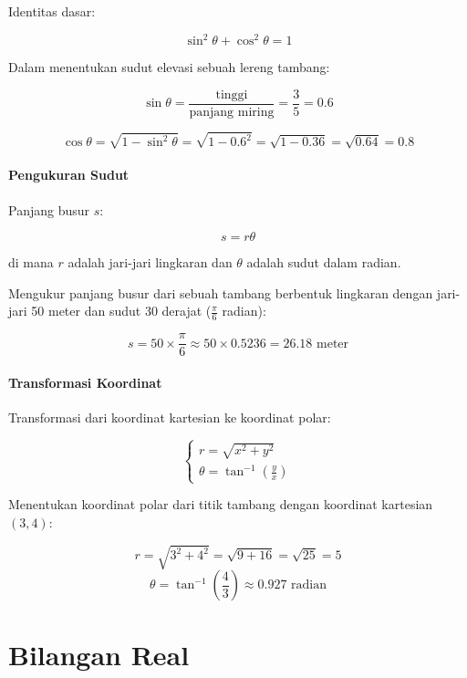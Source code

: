 \documentclass[
]{book}
\begin{document}
Identitas dasar:

\[
\sin^2 \theta + \cos^2 \theta = 1
\]

Dalam menentukan sudut elevasi sebuah lereng tambang:

\[
  \sin \theta = \frac{\text{tinggi}}{\text{panjang miring}} = \frac{3}{5} = 0.6
\]

\[
\cos \theta = \sqrt{1 - \sin^2 \theta} = \sqrt{1 - 0.6^2} = \sqrt{1 - 0.36} = \sqrt{0.64} = 0.8
\]

\subsubsection*{Pengukuran Sudut}\label{pengukuran-sudut}

Panjang busur \(s\):

\[
s = r \theta
\]

di mana \(r\) adalah jari-jari lingkaran dan \(\theta\) adalah sudut dalam radian.

Mengukur panjang busur dari sebuah tambang berbentuk lingkaran dengan jari-jari 50 meter dan sudut 30 derajat (\(\frac{\pi}{6}\) radian):

\[
s = 50 \times \frac{\pi}{6} \approx 50 \times 0.5236 = 26.18 \text{ meter}
\]

\subsubsection*{Transformasi Koordinat}\label{transformasi-koordinat}

Transformasi dari koordinat kartesian ke koordinat polar:

\[
\begin{cases}
r = \sqrt{x^2 + y^2} \\
\theta = \tan^{-1} \left( \frac{y}{x} \right)
\end{cases}
\]

Menentukan koordinat polar dari titik tambang dengan koordinat kartesian \((3, 4)\):

\[
r = \sqrt{3^2 + 4^2} = \sqrt{9 + 16} = \sqrt{25} = 5
\]
\[
\theta = \tan^{-1} \left( \frac{4}{3} \right) \approx 0.927 \text{ radian}
\]

\chapter{Bilangan Real}\label{Bilangan_Real}
\end{document}
